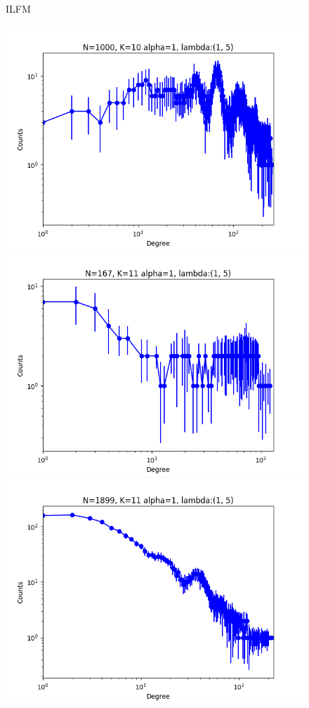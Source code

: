 \documentclass[a4paper, 12pt]{article}
\begin{document}
\begin{figure}[ht]
    \vspace{0.2cm}
	 ILFM

	\includegraphics[scale=0.27]{img/expe/4_ibp/figure_1}
	\endminipage
	\includegraphics[scale=0.27]{img/expe/5_ibp/figure_1}
	\endminipage
	\includegraphics[scale=0.27]{img/expe/6_ibp/figure_1}

\end{figure}
\end{document}
